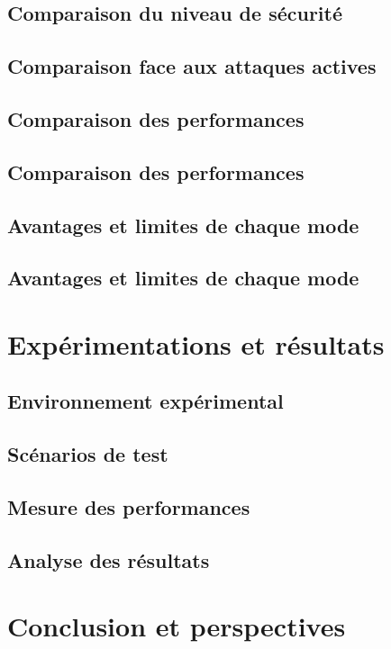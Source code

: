 \documentclass[12pt,a4paper]{article}
\begin{document}
\subsection{Comparaison du niveau de sécurité}
\label{subsec:comparaison_securite}



\subsection{Comparaison face aux attaques actives}
\label{subsec:comparaison_attaques}


\subsection{Comparaison des performances}
\subsection{Comparaison des performances}
\label{subsec:comparaison_performances}


\subsection{Avantages et limites de chaque mode}
\subsection{Avantages et limites de chaque mode}
\label{subsec:avantages_limites}




\section{Expérimentations et résultats}

\subsection{Environnement expérimental}
\subsection{Scénarios de test}
\subsection{Mesure des performances}
\subsection{Analyse des résultats}

\section{Conclusion et perspectives}
\end{document}
